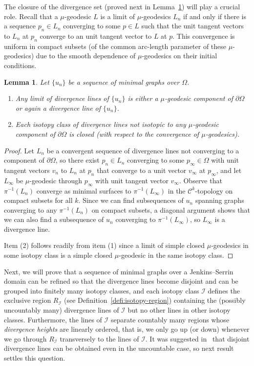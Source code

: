 \documentclass[a4paper,10pt,reqno]{amsart}
\newtheorem{lemma}[theorem]{Lemma}
\theoremstyle{definition}
\theoremstyle{remark}
\numberwithin{equation}{section}
\begin{document}
The closure of the divergence set (proved next in Lemma~\ref{lemma:closure-divlines}) will play a crucial role. Recall that a $\mu$-geodesic $L$ is a limit of $\mu$-geodesics $L_n$ if and only if there is a sequence $p_n\in L_n$ converging to some $p\in L$ such that the unit tangent vectors to $L_n$ at $p_n$ converge to an unit tangent vector to $L$ at $p$. This convergence is uniform in compact subsets (of the common arc-length parameter of these $\mu$-geodesics) due to the smooth dependence of $\mu$-geodesics on their initial conditions.


\begin{lemma}\label{lemma:closure-divlines}
Let $\{u_n\}$ be a sequence of minimal graphs over $\Omega$.
\begin{enumerate}[label=\emph{(\arabic*)}]
	\item Any limit of divergence lines of $\{u_n\}$ is either a $\mu$-geodesic component of $\partial\Omega$ or again a divergence line of $\{u_n\}$.
	\item Each isotopy class of divergence lines not isotopic to any $\mu$-geodesic component of $\partial\Omega$ is closed (with respect to the convergence of $\mu$-geodesics).
\end{enumerate}
\end{lemma}

\begin{proof}
Let $L_n$ be a convergent sequence of divergence lines not converging to a component of $\partial\Omega$, so there exist $p_n\in L_n$ converging to some $p_\infty\in \Omega$ with unit tangent vectors $v_n$ to $L_n$ at $p_n$ that converge to a unit vector $v_\infty$ at $p_\infty$, and let $L_\infty$ be $\mu$-geodesic through $p_\infty$ with unit tangent vector $v_\infty$. Observe that $\pi^{-1}(L_n)$ converge as minimal surfaces to $\pi^{-1}(L_\infty)$ in the $\mathcal C^k$-topology on compact subsets for all $k$. Since we can find subsequences of $u_n$ spanning graphs converging to any $\pi^{-1}(L_n)$ on compact subsets, a diagonal argument shows that we can also find a subsequence of $u_n$ converging to $\pi^{-1}(L_\infty)$, so $L_\infty$ is a divergence line.

Item (2) follows readily from item (1) since a limit of simple closed $\mu$-geodesics in some isotopy class is a simple closed $\mu$-geodesic in the same isotopy class.
\end{proof}

Next, we will prove that a sequence of minimal graphs over a Jenkins--Serrin domain can be refined so that the divergence lines become disjoint and can be grouped into finitely many isotopy classes, and each isotopy class $\mathcal I$ defines the exclusive region $R_{\mathcal I}$ (see Definition~\ref{defi:isotopy-region}) containing the (possibly uncountably many) divergence lines of $\mathcal I$ but no other lines in other isotopy classes. Furthermore, the lines of $\mathcal I$ separate countably many regions whose \emph{divergence heights} are linearly ordered, that is, we only go up (or down) whenever we go through $R_{\mathcal I}$ transversely to the lines of $\mathcal I$. It was suggested in~\cite[Rmk.~4.5]{MRR} that disjoint divergence lines can be obtained even in the uncountable case, so next result settles this question.
\end{document}

